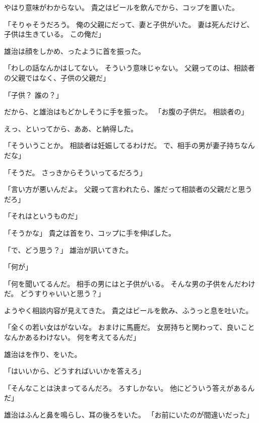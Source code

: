 \documentclass[chapter3.tex]{subfiles}
\begin{document}
\begin{CJK}{UTF8}{ipxm}
    やはり意味がわからない。
    貴之はビールを飲んでから、コップを置いた。

    「そりゃそうだろう。
    俺の父親にだって、妻と子供がいた。
    妻は死んだけど、子供は生きている。
    この俺だ」

    雄治は顔をしかめ、ったように首を振った。

    「わしの話なんかはしてない。
    そういう意味じゃない。
    父親ってのは、相談者の父親ではなく、子供の父親だ」

    「子供？
    誰の？」

    だから、と雄治はもどかしそうに手を振った。
    「お腹の子供だ。
    相談者の」

    えっ、といってから、ああ、と納得した。

    「そういうことか。
    相談者は妊娠してるわけだ。
    で、相手の男が妻子持ちなんだな」

    「そうだ。
    さっきからそういってるだろう」

    「言い方が悪いんだよ。
    父親って言われたら、誰だって相談者の父親だと思うだろ」

    「それはというものだ」

    「そうかな」
    貴之は首をり、コップに手を伸ばした。
    
    「で、どう思う？」
    雄治が訊いてきた。

    「何が」

    「何を聞いてるんだ。
    相手の男にはと子供がいる。
    そんな男の子供をんだわけだ。
    どうすりゃいいと思う？」


    ようやく相談内容が見えてきた。
    貴之はビールを飲み、ふうっと息を吐いた。

    「全くの若い女はがないな。
    おまけに馬鹿だ。
    女房持ちと関わって、良いことなんかあるわけない。
    何を考えてるんだ」

    雄治はを作り、をいた。

    「はいいから、どうすればいいかを答えろ」

    「そんなことは決まってるんだろ。
    ろすしかない。
    他にどういう答えがあるんだ」

    雄治はふんと鼻を鳴らし、耳の後ろをいた。
    「お前にいたのが間違いだった」


\end{CJK}
\end{document}
